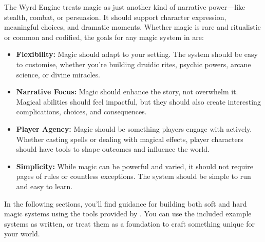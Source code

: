 The Wyrd Engine treats magic as just another kind of narrative power—like stealth, combat, or persuasion. It should support character expression, meaningful choices, and dramatic moments. Whether magic is rare and ritualistic or common and codified, the goals for any magic system in \wyrd are:

\begin{itemize}
    \item \textbf{Flexibility:} Magic should adapt to your setting. The system should be easy to customise, whether you’re building druidic rites, psychic powers, arcane science, or divine miracles.
    \item \textbf{Narrative Focus:} Magic should enhance the story, not overwhelm it. Magical abilities should feel impactful, but they should also create interesting complications, choices, and consequences.
    \item \textbf{Player Agency:} Magic should be something players engage with actively. Whether casting spells or dealing with magical effects, player characters should have tools to shape outcomes and influence the world.
    \item \textbf{Simplicity:} While magic can be powerful and varied, it should not require pages of rules or countless exceptions. The system should be simple to run and easy to learn.
\end{itemize}

In the following sections, you'll find guidance for building both soft and hard magic systems using the tools provided by \wyrd. You can use the included example systems as written, or treat them as a foundation to craft something unique for your world.
